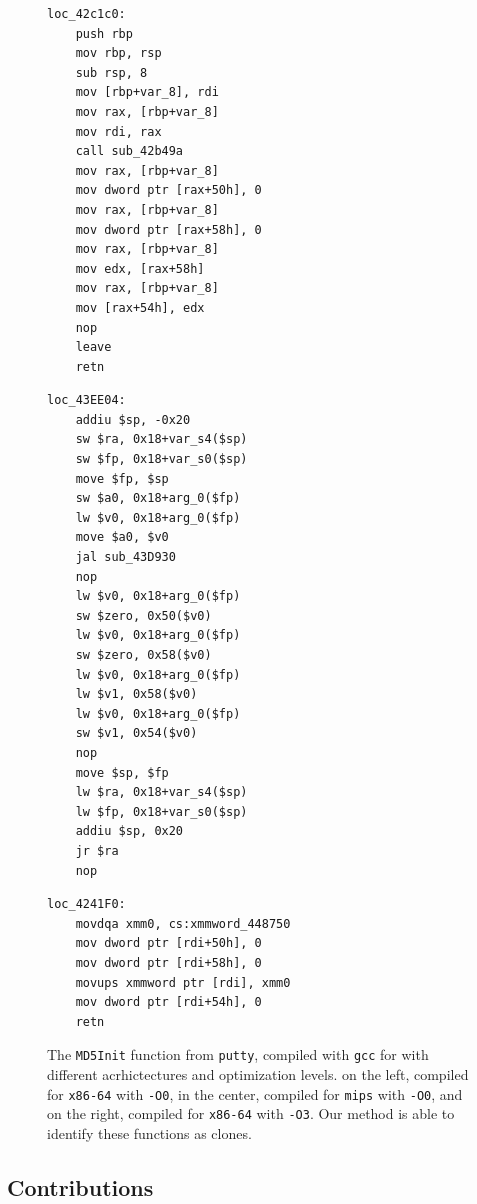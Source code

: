 \begin{figure}[!t]
\centering
\begin{minipage}[t]{0.32\linewidth}
\centering
\begin{verbatim}
loc_42c1c0:
    push rbp
    mov rbp, rsp
    sub rsp, 8
    mov [rbp+var_8], rdi
    mov rax, [rbp+var_8]
    mov rdi, rax
    call sub_42b49a
    mov rax, [rbp+var_8]
    mov dword ptr [rax+50h], 0
    mov rax, [rbp+var_8]
    mov dword ptr [rax+58h], 0
    mov rax, [rbp+var_8]
    mov edx, [rax+58h]
    mov rax, [rbp+var_8]
    mov [rax+54h], edx
    nop 
    leave 
    retn 
\end{verbatim}
\end{minipage}
\hfill
\begin{minipage}[t]{0.32\linewidth}
\centering
\begin{verbatim}
loc_43EE04:
    addiu $sp, -0x20
    sw $ra, 0x18+var_s4($sp)
    sw $fp, 0x18+var_s0($sp)
    move $fp, $sp
    sw $a0, 0x18+arg_0($fp)
    lw $v0, 0x18+arg_0($fp)
    move $a0, $v0
    jal sub_43D930
    nop 
    lw $v0, 0x18+arg_0($fp)
    sw $zero, 0x50($v0)
    lw $v0, 0x18+arg_0($fp)
    sw $zero, 0x58($v0)
    lw $v0, 0x18+arg_0($fp)
    lw $v1, 0x58($v0)
    lw $v0, 0x18+arg_0($fp)
    sw $v1, 0x54($v0)
    nop 
    move $sp, $fp
    lw $ra, 0x18+var_s4($sp)
    lw $fp, 0x18+var_s0($sp)
    addiu $sp, 0x20
    jr $ra
    nop 
\end{verbatim}
\end{minipage}
\begin{minipage}[t]{0.32\linewidth}
\centering
\begin{verbatim}
loc_4241F0:
    movdqa xmm0, cs:xmmword_448750
    mov dword ptr [rdi+50h], 0
    mov dword ptr [rdi+58h], 0
    movups xmmword ptr [rdi], xmm0
    mov dword ptr [rdi+54h], 0
    retn
\end{verbatim}
\end{minipage}
\caption{The \texttt{MD5Init} function from \texttt{putty}, compiled with \texttt{gcc} for with different acrhictectures and optimization levels.
    on the left, compiled for \texttt{x86-64} with \texttt{-O0}, in the center, compiled for \texttt{mips} with \texttt{-O0}, and on the right,
    compiled for \texttt{x86-64} with \texttt{-O3}.  Our method is able to identify these functions as clones.}
\label{asm-diff}
\end{figure}

\subsection{Contributions}

